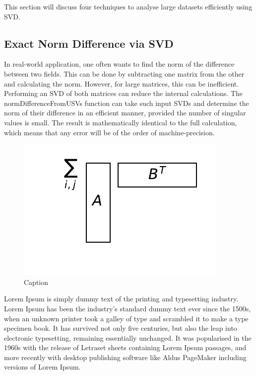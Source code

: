 \documentclass{acm_proc_article-sp}
\begin{document}
This section will discuss four techniques to analyse large datasets efficiently using SVD.

\subsection{Exact Norm Difference via SVD}
\label{sec:Techniques Exact Norm Difference via SVD}

In real-world application, one often wants to find the norm of the difference between two fields. This can be done by subtracting one matrix from the other and calculating the norm. However, for large matrices, this can be inefficient. Performing an SVD of both matrices can reduce the internal calculations. The normDifferenceFromUSVs function can take such input SVDs and determine the norm of their difference in an efficient manner, provided the number of singular values is small. The result is mathematically identical to the full calculation, which means that any error will be of the order of machine-precision.

\begin{figure}[h]
\begin{center}
\includegraphics[scale=0.3]{Results/normDifferenceFromUSVs.pdf}
\caption[Small caption]{Caption}
\label{fig:normDifferenceFromUSVs}
\end{center}
\end{figure}

Lorem Ipsum is simply dummy text of the printing and typesetting industry. Lorem Ipsum has been the industry's standard dummy text ever since the 1500s, when an unknown printer took a galley of type and scrambled it to make a type specimen book. It has survived not only five centuries, but also the leap into electronic typesetting, remaining essentially unchanged. It was popularised in the 1960s with the release of Letraset sheets containing Lorem Ipsum passages, and more recently with desktop publishing software like Aldus PageMaker including versions of Lorem Ipsum.
\end{document}

